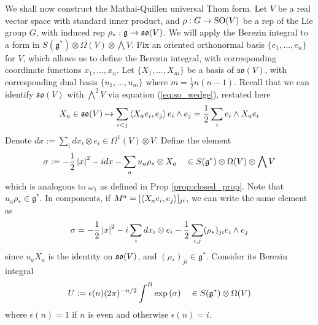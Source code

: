 We shall now construct the Mathai-Quillen universal Thom form.
Let $V$ be a real vector space with standard inner product, and $\rho : G \to
\operatorname{SO}(V)$ be a rep of the Lie group $G$, with induced rep $\rho_* :
\mathfrak{g}\to \operatorname{\mathfrak{so}}(V)$.
We will apply the Berezin integral to a form in $S(\mathfrak{g}^*)\otimes 
\Omega(V) \otimes \bigwedge V$. 
Fix an oriented orthonormal basis $\{e_1,\ldots,e_n\}$ for
$V$, which allows us to define the Berezin integral, with corresponding
coordinate functions $x_1,\ldots,x_n$.   
Let  $\{X_1,\ldots,X_m\}$ be a basis of $\mathfrak{so}(V)$, with corresponding
dual basis $\{u_1,\ldots,u_m\}$ where $m= \frac{1}{2}n(n-1)$. Recall that we 
can identify $\mathfrak{so}(V)$ with 
$\bigwedge^2 V$ via equation (\ref{eq:so_wedge}), restated here 
\[
	X_a \in\mathfrak{so}(V) \mapsto \sum_{i<j}\gen{X_a e_i,e_j} e_i\wedge e_j
	= \frac{1}{2}\sum_{i} e_i\wedge X_a e_i
\] 
Denote $dx := \sum_i dx_i \otimes e_i \in \Omega^1(V)\otimes V$. Define the element 
\begin{equation} %
	\label{eq:universal_thom_exponent}
	\sigma := -\frac{1}{2}\abs{x}^2 - idx 
	- \sum_a u_a\rho_* \otimes X_a 
	\quad \in S(\g^*) \otimes \Omega(V) \otimes \bigwedge V
\end{equation}
which is analogous to $\omega_1$ as defined in Prop \ref{prop:closed_prop}.
Note that $u_a \rho_* \in \mathfrak{g}^*$.
In components, if $M^a = [\gen{ X_ae_i,e_j}]_{ji}$, we can write the same
element as 
\begin{equation} \label{eq:universal_thom_exponent2}
\sigma = -\frac{1}{2}\abs{x}^2 - i\sum_i dx_i\otimes e_i 
	-\frac{1}{2} \sum_{i,j} (\rho_*)_{ji}e_i\wedge e_j
\end{equation}
since $u_aX_a$ is the identity on  $\operatorname{\mathfrak{so}}(V)$, and $(\rho_*)_{ji} \in \mathfrak{g}^*$.
Consider its Berezin integral
\begin{equation} \label{eq:universal_thom}
	U := \epsilon(n)(2\pi)^{-n /2}\int^B \exp\paren{\sigma}  
	\quad\in S(\g^*)\otimes \Omega(V)
\end{equation}
where $\epsilon(n)=1$ if $n$ is even and otherwise $\epsilon(n)=i$.

